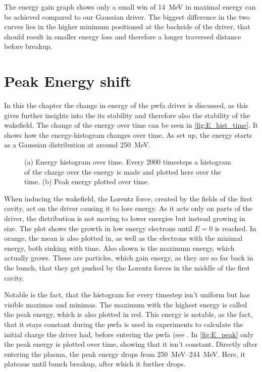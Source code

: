 \documentclass[bachelor_thesis]{subfiles}
\begin{document}
The energy gain graph  shows only a small win of \qty{14}{\MeV} in maximal energy can be achieved compared to our Gaussian driver. The biggest difference in the two curves lies
in the higher minimum positioned at the backside of the driver, that should result in smaller energy loss and therefore a longer traversed distance before breakup.

\section{Peak Energy shift}
In this the chapter the change in energy of the \gls{pwfa} driver is discussed, as this gives further insights into the its stability and therefore also the stability of the wakefield.
The change of the energy over time can be seen in \autoref{fig:E_hist_time}. It shows how the energy-histogram changes over time. As set up, the energy starts as a Gaussian distribution at around \qty{250}{\MeV}.
\begin{figure}
	\centering
	\begin{subfigure}{0.5\textwidth}
	\centering
	\missingfigure{}
	\caption{} \label{fig:E_hist_time}
	\end{subfigure}
	\hfill
	\begin{subfigure}{0.5\textwidth}
	\centering
	\missingfigure{}
	\caption{} \label{fig:E_peak}
	\end{subfigure}
	\caption{(a) Energy histogram over time. Every 2000 timesteps a histogram of the charge over the energy is made and plotted here over the time.
	(b) Peak energy plotted over time.}
	\label{fig:Energy}
\end{figure}
When inducing the wakefield, the Lorentz force, created by the fields of the first cavity, act on the driver causing it to lose energy. As it acts only on parts of the driver, the distribution is not moving to lower energies but instead growing in size.
The plot shows the growth in low energy electrons until $E=0$ is reached. In orange, the mean is also plotted in,  as well as the electrons with the minimal energy, both sinking with time. Also shown is the maximum energy, which actually grows.
These are particles, which gain energy, as they are so far back in the bunch, that they get pushed by the Lorentz forces in the middle of the first cavity.

Notable is the fact, that the histogram for every timestep isn't uniform but has visible maximas and minimas. The maximum with the highest energy is called the peak energy, which is also plotted in red.
This energy is notable, as the fact, that it stays constant during the \gls{pwfa} is used in experiments to calculate the initial charge the driver had, before entering the \gls{pwfa} (see \cite{Schoebel2022}.
In \autoref{fig:E_peak} only the peak energy is plotted over time, showing that it isn't constant. Directly after entering the plasma, the peak energy drops from \qtyrange{250}{244}{\MeV}.
Here, it plateaus until bunch breakup, after which it further drops.
\end{document}
